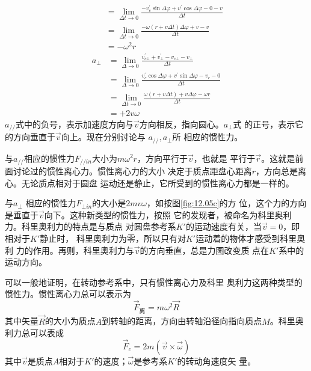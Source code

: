 ~\vspace{-1.8em}
\begin{equation}\label{eqn:12.02.04}
    \begin{aligned}
        ~~~~~&=\lim _{\Delta t \to 0} \frac{-v_{c}^{\prime} \sin \Delta \varphi+v^{\prime} \cos \Delta \varphi-0-v}{\Delta t} \\
        &=\lim _{\Delta t \to 0} \frac{-\omega(r+v \Delta t) \Delta \varphi+v-v}{\Delta t} \\
        &=-\omega^{2} r
    \end{aligned}
\end{equation}
\begin{equation}\label{eqn:12.02.05}
    \begin{aligned}
        a_{\bot} &=\lim _{\Delta \rightarrow 0} \frac{v_{c \bot}^{\prime}+v_{\bot}^{\prime}-v_{c \bot}-v_{\bot}}{\Delta t} \\
        &=\lim _{\Delta \rightarrow 0} \frac{v_{c}^{\prime} \cos \Delta \varphi+v^{\prime} \sin \Delta \varphi-v_{c}-0}{\Delta t} \\
        &=\lim _{\Delta t \rightarrow 0} \frac{\omega(r+v \Delta t)+v \Delta \varphi-\omega r}{\Delta t} \\
        &=+2 v \omega
    \end{aligned}
\end{equation}
$ a_{//} $式中的负号，表示加速度方向与$\vec{v}$方向相反，指向圆心。$ a_{\bot} $式
的正号，表示它的方向垂直于$\vec{v}$向上。现在分别讨论与 $ a_{//}, a_{\bot}$所
相应的惯性力。

与$ a_{//} $相应的惯性力$ F_{//in} $大小为$ m\omega ^ 2 r $，方向平行于$\vec{v}$，也就是
平行于$\vec{r}$。这就是前面讨论过的惯性离心力。惯性离心力的大小
决定于质点距盘心距离$ r $，方向总是离心。无论质点相对于圆盘
运动还是静止，它所受到的惯性离心力都是一样的。

与$ a _ { \bot } $ 相应的惯性力$ F_{\bot in} $的大小是$ 2mv\omega $，如按图\ref{fig:12.05c}的方
位，这个力的方向是垂直于$\vec{v}$向下。这种新类型的惯性力，按照
它的发现者，被命名为科里奥利力。科里奥利力的特点是与质点
对圆盘参考系$ K' $的运动速度有关，当$  \vec{v} = 0   $，即相对于$ K' $静止时，
科里奥利力为零，所以只有对$ K' $运动着的物体才感受到科里奥利
力的作用。再则，科里奥利力与$\vec{v}$的方向垂直，总是力图改变质
点在$ K' $系中的运动方向。

可以一般地证明，在转动参考系中，只有惯性离心力及科里
奥利力这两种类型的惯性力。惯性离心力总可以表示为
\begin{equation}\label{eqn:12.02.06}
    \vec{F} _ \text{离} = m \omega ^ { 2 } \vec{R}
\end{equation}
其中矢量$\vec{R}$的大小为质点$ A $到转轴的距离，方向由转轴沿径向指向质点$ M $。科里奥利力总可以表成
\begin{equation}\label{eqn:12.02.07}
    \vec{F} _ { c } = 2 m \left( \vec{v} \times \vec{\omega} \right)
\end{equation}
其中$\vec{v}$是质点$ A $相对于$ K' $的速度；$\vec{\omega}$是参考系$ K' $的转动角速度矢
量。

